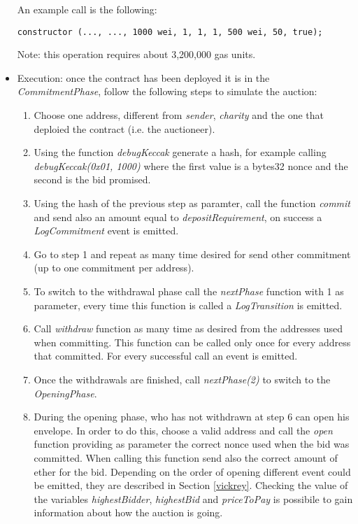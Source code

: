 \documentclass{article}
\begin{document}
\begin{itemize}
        An example call is the following:
        \begin{lstlisting}[language=Solidity]
constructor (..., ..., 1000 wei, 1, 1, 1, 500 wei, 50, true);
        \end{lstlisting}
    Note: this operation requires about 3,200,000 gas units.
    \item Execution: once the contract has been deployed it is in the \textit{CommitmentPhase}, follow the following steps to simulate the auction:
    \begin{enumerate}
        \item Choose one address, different from \textit{sender}, \textit{charity} and the one that deploied the contract (i.e. the auctioneer).
        \item Using the function \textit{debugKeccak} generate a hash, for example calling \textit{debugKeccak(0x01, 1000)} where the first value is a bytes32 nonce and the second is the bid promised.
        \item Using the hash of the previous step as paramter, call the function \textit{commit} and send also an amount equal to \textit{depositRequirement}, on success a \textit{LogCommitment} event is emitted.
        \item Go to step 1 and repeat as many time desired for send other commitment (up to one commitment per address).
        \item To switch to the withdrawal phase call the \textit{nextPhase} function with 1 as parameter, every time this function is called a \textit{LogTransition} is emitted.
        \item Call \textit{withdraw} function as many time as desired from the addresses used when committing. This function can be called only once for every address that committed. For every successful call an event is emitted.
        \item Once the withdrawals are finished, call \textit{nextPhase(2)} to switch to the \textit{OpeningPhase}.
        \item During the opening phase, who has not withdrawn at step 6 can open his envelope. In order to do this, choose a valid address and call the \textit{open} function providing as parameter the correct nonce used when the bid was committed. When calling this function send also the correct amount of ether for the bid. Depending on the order of opening different event could be emitted, they are described in Section \ref{vickrey}. Checking the value of the variables \textit{highestBidder}, \textit{highestBid} and \textit{priceToPay} is possibile to gain information about how the auction is going.

\end{enumerate}
\end{itemize}
\end{document}

